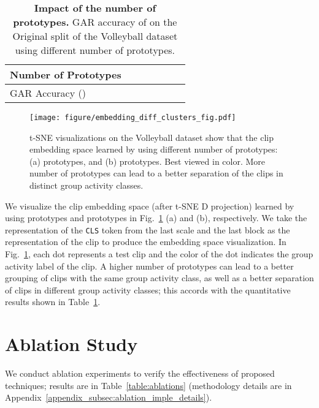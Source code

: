\documentclass[runningheads]{llncs}
\begin{document}
\begin{table}[ht]\centering
\setlength{\tabcolsep}{4.8pt}
\caption{\textbf{Impact of the number of prototypes.} GAR accuracy of \ours on the Original split of the Volleyball dataset using different number of prototypes. 
   }
   \label{table:num_clusters}
   \begin{tabular}[t]{lcccccc}
   \toprule
   \textbf{Number of Prototypes} &   &   &  &  &  &  \\
   \midrule
 GAR Accuracy ()   &     &    &    &   &    &      \\
   \bottomrule
   \end{tabular}
\end{table}
 


\begin{figure}[ht]
	\centering
	\texttt{[image: figure/embedding\_diff\_clusters\_fig.pdf]}
	\caption{t-SNE visualizations on the Volleyball dataset  show that the clip embedding space learned by \ours using different number of prototypes: (a)  prototypes, and (b)  prototypes. Best viewed in color. More number of prototypes can lead to a  
	better separation of the clips in distinct group activity classes. 
}
	\label{fig:embedding_diff_clusters} 
\end{figure} 

We visualize the clip embedding space (after t-SNE D projection) learned by \ours using  prototypes and  prototypes in Fig.~\ref{fig:embedding_diff_clusters} (a) and (b), respectively. We take the representation of the \texttt{CLS} token from the last scale and the last \mtx block as the representation of the clip to produce the embedding space visualization. In Fig.~\ref{fig:embedding_diff_clusters}, each dot represents a test clip and the color of the dot indicates the group activity label of the clip. A higher number of prototypes can lead to a better grouping of clips with the same group activity class, as well as a better separation of clips in different group activity classes; this accords with the quantitative results shown in Table~\ref{table:num_clusters}.



\renewcommand{\thesection}{B}
\section{Ablation Study}
\label{appendix_sec:ablation_study}
 
 

We conduct ablation experiments to verify the effectiveness of proposed techniques; results are in Table~\ref{table:ablations} (methodology details 
are in Appendix~\ref{appendix_subsec:ablation_imple_details}).
\end{document}
